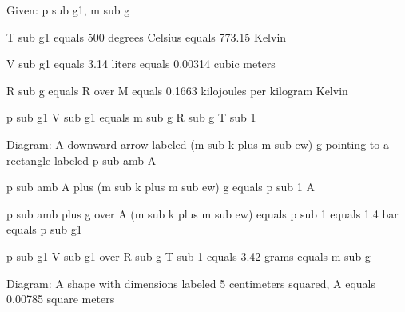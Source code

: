 Given: p sub g1, m sub g

T sub g1 equals 500 degrees Celsius equals 773.15 Kelvin

V sub g1 equals 3.14 liters equals 0.00314 cubic meters

R sub g equals R over M equals 0.1663 kilojoules per kilogram Kelvin

p sub g1 V sub g1 equals m sub g R sub g T sub 1

Diagram: A downward arrow labeled (m sub k plus m sub ew) g pointing to a rectangle labeled p sub amb A

p sub amb A plus (m sub k plus m sub ew) g equals p sub 1 A

p sub amb plus g over A (m sub k plus m sub ew) equals p sub 1 equals 1.4 bar equals p sub g1

p sub g1 V sub g1 over R sub g T sub 1 equals 3.42 grams equals m sub g

Diagram: A shape with dimensions labeled 5 centimeters squared, A equals 0.00785 square meters